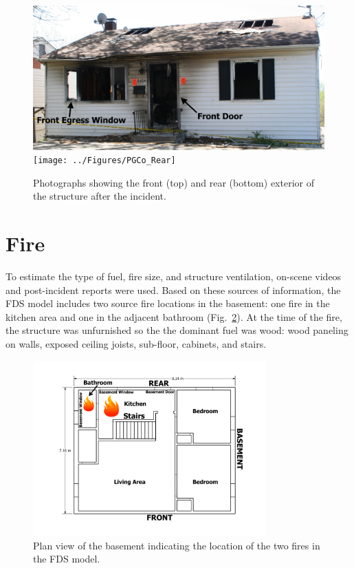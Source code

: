 \documentclass[12pt,oneside]{book}
\begin{document}
\begin{figure}[!ht]
\includegraphics[width=\textwidth]{../Figures/PGCo_Front} \\ 
\vspace{0.1in}
\texttt{[image: ../Figures/PGCo\_Rear]}
\caption{Photographs showing the front (top) and rear (bottom) exterior of the structure after the incident.}
\label{fig:exterior}
\end{figure}

\clearpage

\section{Fire}
\label{fire}
To estimate the type of fuel, fire size, and structure ventilation, on-scene videos and post-incident reports were used. Based on these sources of information, the FDS model includes two source fire locations in the basement: one fire in the kitchen area and one in the adjacent bathroom (Fig.~\ref{fig:basement_fire}). At the time of the fire, the structure was unfurnished so the the dominant fuel was wood: wood paneling on walls, exposed ceiling joists, sub-floor, cabinets, and stairs.

\begin{figure}[!ht]
\includegraphics[width=0.8\textwidth]{../Figures/Basement_Fire}
\caption[Plan view of basement indicating fire location.]{Plan view of the basement indicating the location of the two fires in the FDS model.}
\label{fig:basement_fire}
\end{figure}
\end{document}
